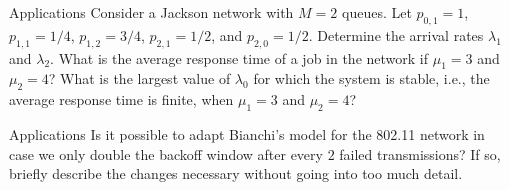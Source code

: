 \begin{problem}{Applications}
Consider a Jackson network with $M = 2$ queues. Let $p_{0,1} = 1$, $p_{1,1} = 1/4$, $p_{1,2} = 3/4$, $p_{2,1} = 1/2$, and $p_{2,0} = 1/2$. Determine the arrival rates $\lambda_1$ and $\lambda_2$. What is the average response time of a job in the network if $\mu_1 = 3$ and $\mu_2 = 4$? What is the largest value of $\lambda_0$ for which the system is stable, i.e., the average response time is finite, when $\mu_1 = 3$ and $\mu_2 = 4$?
\end{problem}

\begin{problem}{Applications}
Is it possible to adapt Bianchi’s model for the 802.11 network in case we only double the backoff window after every $2$ failed transmissions? If so, briefly describe the changes necessary without going into too much detail.
\end{problem}
